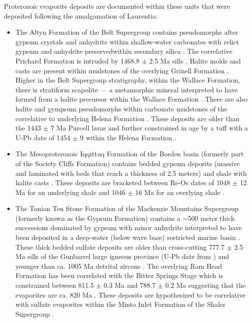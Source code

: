 \documentclass[11pt,letterpaper]{article}
\begin{document}
Proterozoic evaporite deposits are documented within these units that were deposited following the amalgamation of Laurentia: 
\begin{itemize}
\item The Altyn Formation of the Belt Supergroup contains pseudomorphs after gypsum crystals and anhydrite within shallow-water carbonates with relict gypsum and anhydrite preservedwithin secondary silica \citep{White1984a}. The correlative Prichard Formation is intruded by 1468.8 $\pm$ 2.5 Ma sills \citep{Sears1998a}. Halite molds and casts are present within mudstones of the overlying Grinell Formation \citep{Pratt2019a}. Higher in the Belt Supergroup stratigraphy, within the Wallace Formation, there is stratiform scapolite --- a metamorphic mineral interpreted to have formed from a halite precursor within the Wallace Formation \citep{Hietanen1967a}. There are also halite and gympsum pseudomorphs within carbonate mudstones of the correlative to underlying Helena Formation \citep{Pratt2001a,Winston2007a}.  These deposits are older than the 1443 $\pm$ 7 Ma Purcell lavas and further constrained in age by a tuff with a U-Pb date of 1454 $\pm$ 9 within the Helena Formation \citep{Evans2000c}. 
\item The Mesoproterozoic Iqqittuq Formation of the Borden basin (formerly part of the Society Cliffs Formation) contains bedded gypsum deposits (massive and laminated with beds that reach a thickness of 2.5 meters) and shale with halite casts \citep{Kah2001a}.  These deposits are bracketed between Re-Os dates of 1048 $\pm$ 12 Ma for an underlying shale and 1046 $\pm$ 16 Ma for an overlying shale \citep{Gibson2018a}.
\item The Tonian Ten Stone Formation of the Mackenzie Mountains Supergroup (formerly known as the Gypsum Formation) contains a $\sim$500 meter thick successions dominated by gypsum with minor anhydrite interpreted to have been deposited in a deep-water (below wave base) restricted marine basin \citep{Turner2016a} . These thick bedded sulfate deposits are older than cross-cutting 777.7 $\pm$ 2.5 Ma sills of the Gunbarrel large igneous province (U-Pb date from \citealp{Jefferson1989a}) and younger than ca. 1005 Ma detrital zircons \citep{Turner2016a}. The overlying Ram Head Formation has been correlated with the Bitter Springs Stage which is constrained between 811.5 $\pm$ 0.3 Ma and 788.7 $\pm$ 0.2 Ma \citep{Macdonald2010a, Swanson-Hysell2015a} suggesting that the evaporites are ca. 820 Ma \citep{Turner2016a}. These deposits are hypothesized to be correlative with sulfate evaporites within the Minto Inlet Formation of the Shaler Supergroup \citep{Jones2010a, Turner2016a}.

\end{itemize}
\end{document}
